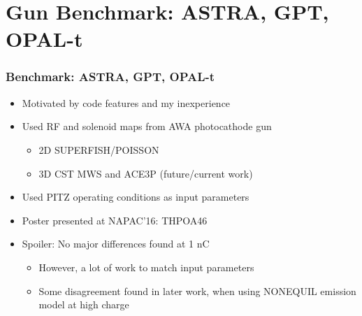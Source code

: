 \documentclass{beamer}
\begin{document}
\section{Gun Benchmark: ASTRA, GPT, OPAL-t}
\begin{frame}
  \frametitle{Benchmark: ASTRA, GPT, OPAL-t}
  \begin{itemize}
    \item{Motivated by code features and my inexperience}
    \item{Used RF and solenoid maps from AWA photocathode gun}
    \begin{itemize}
    	\item 2D SUPERFISH/POISSON
    	\item 3D CST MWS and ACE3P (future/current work)
    \end{itemize}
    \item{Used PITZ operating conditions as input parameters}
    \item{Poster presented at NAPAC'16: THPOA46}
    \item{Spoiler: No major differences found at 1 nC}
        \begin{itemize}
        	\item However, a lot of work to match input parameters
        	\item Some disagreement found in later work, when using NONEQUIL emission model at high charge
        \end{itemize}
  \end{itemize}
\end{frame}
\end{document}
